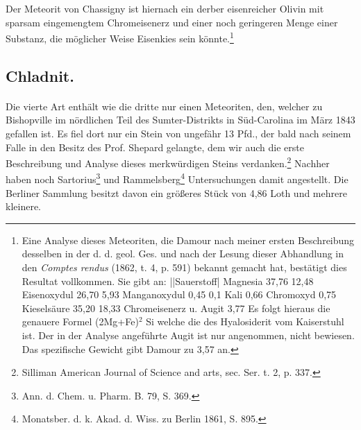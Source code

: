 \documentclass[a4paper, 11pt, oneside]{article}
\begin{document}
Der Meteorit von Chassigny ist hiernach ein derber eisenreicher Olivin mit sparsam eingemengtem Chromeisenerz und einer noch geringeren Menge einer Substanz, die möglicher Weise Eisenkies sein könnte.\footnote{Eine Analyse dieses Meteoriten, die Damour nach meiner ersten Beschreibung desselben in der d. d. geol. Ges. und nach der Lesung dieser Abhandlung in den \emph{Comptes rendus} (1862, t. 4, p. 591) bekannt gemacht hat, bestätigt dies Resultat vollkommen. Sie gibt an:
||Sauerstoff|  
Magnesia 37,76 12,48  
Eisenoxydul 26,70 5,93  
Manganoxydul 0,45 0,1  
Kali 0,66  
Chromoxyd 0,75  
Kieselsäure 35,20 18,33  
Chromeisenerz u. Augit 3,77  
Es folgt hieraus die genauere Formel  
(2Mg+Fe)$^{2}$ Si  
welche die des Hyalosiderit vom Kaiserstuhl ist. Der in der Analyse angeführte Augit ist nur angenommen, nicht bewiesen. Das spezifische Gewicht gibt Damour zu 3,57 an.}
\subsection{Chladnit.}
\paragraph{}
Die vierte Art enthält wie die dritte nur einen Meteoriten, den, welcher zu Bishopville im nördlichen Teil des Sumter-Distrikts in Süd-Carolina im März 1843 gefallen ist. Es fiel dort nur ein Stein von ungefähr 13 Pfd., der bald nach seinem Falle in den Besitz des Prof. Shepard gelangte, dem wir auch die erste Beschreibung und Analyse dieses merkwürdigen Steins verdanken.\footnote{Silliman American Journal of Science and arts, sec. Ser. t. 2, p. 337.} Nachher haben noch Sartorius\footnote{Ann. d. Chem. u. Pharm. B. 79, S. 369.} und Rammelsberg\footnote{Monatsber. d. k. Akad. d. Wiss. zu Berlin 1861, S. 895.} Untersuchungen damit angestellt. Die Berliner Sammlung besitzt davon ein größeres Stück von 4,86 Loth und mehrere kleinere.
\end{document}
